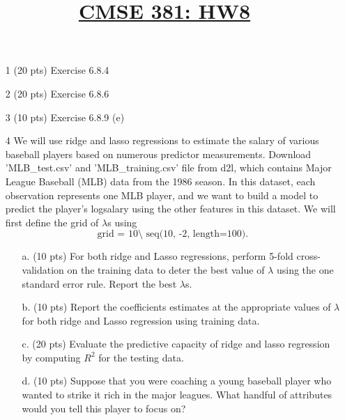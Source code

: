 \documentclass[11pt]{article}
\title{\underline{CMSE 381: HW8}}
\date{}
\newcommand{\blankline}{\quad\pagebreak[2]}
\begin{document}
\maketitle

\blankline

\begin{enumerate}
	\item[1] (20 pts) Exercise 6.8.4
	\item[2] (20 pts) Exercise 6.8.6 
	\item[3] (10 pts) Exercise 6.8.9 (e)
	\item[4] We will use ridge and lasso regressions to estimate the salary of various baseball players based on numerous predictor measurements. 
	Download 'MLB\_test.csv' and 'MLB\_training.csv' file from d2l, which contains Major League Baseball (MLB) data from the 1986 season. In this dataset,
each observation represents one MLB player, and we want to build a model to predict the player's logsalary using the other features in this dataset. We will first define the grid of $\lambda$s using 
	\[  
   \text{grid = 10\^ \ \ seq(10, -2, length=100)}.
	\]
\begin{itemize}
 \item[a.] (10 pts) For both ridge and Lasso regressions, perform 5-fold cross-validation on the training data to deter the best value of $\lambda$ using the one standard error rule. Report the best $\lambda$s. 
 \item[b.] (10 pts) Report the coefficients estimates at the appropriate values of $\lambda$ for both ridge and Lasso regression using training data. 
 \item[c.] (20 pts) Evaluate the predictive capacity of ridge and lasso regression by computing $R^2$ for the testing data.
 \item[d.] (10 pts) Suppose that you were coaching a young baseball player who wanted to strike it rich in the major leagues. What handful of attributes would you tell this player to focus on?
\end{itemize}	
\end{enumerate}
\end{document}
